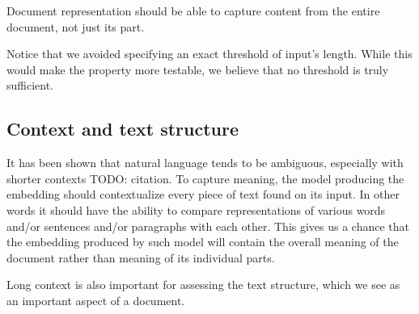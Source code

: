 \begin{repre_prop}\label{repre_prop:long-inputs}

  Document representation should be able to capture content from the entire
  document, not just its part.

\end{repre_prop}

Notice that we avoided specifying an exact threshold of input's length. While
this would make the property more testable, we believe that no threshold is
truly sufficient.

\subsection{Context and text structure}

It has been shown that natural language tends to be ambiguous, especially with
shorter contexts TODO: citation. To capture meaning, the model producing the
embedding should contextualize every piece of text found on its input. In other
words it should have the ability to compare representations of various words
and/or sentences and/or paragraphs with each other. This gives us a chance that
the embedding produced by such model will contain the overall meaning of the
document rather than meaning of its individual parts.

Long context is also important for assessing the text structure, which we see as an important
aspect of a document.
